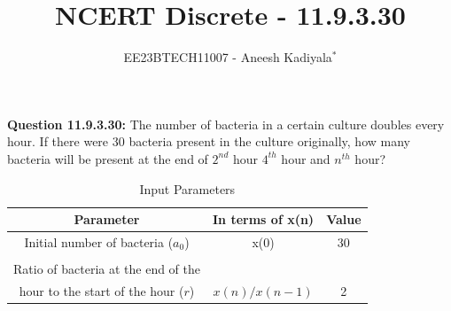 \documentclass[journal,12pt,twocolumn]{IEEEtran}
\theoremstyle{remark}
\begin{document}

\vspace{3cm}

\title{NCERT Discrete - 11.9.3.30}
\author{EE23BTECH11007 - Aneesh Kadiyala$^{*}$%
}
\maketitle
\newpage
\bigskip

\renewcommand{\thefigure}{\theenumi}
\renewcommand{\thetable}{\theenumi}

\vspace{3cm}
\textbf{Question 11.9.3.30:} The number of bacteria in a certain culture doubles every hour. If there were 30 bacteria present in the culture originally, how many bacteria will be present at the end of $2^{nd}$ hour $4^{th}$ hour and $n^{th}$ hour?
\\
\solution

\begin{table}[h!]
    \centering
    \caption{Input Parameters}
    \label{tab:1}
    \begin{tabular}{ | c | c | c | }
        \hline
        Parameter & In terms of x(n) & Value \\
        \hline
        Initial number of bacteria ($a_0$) & x(0) & 30 \\
        &&\\
        Ratio of bacteria at the end of the & & \\
        hour to the start of the hour ($r$) & $x(n)/x(n - 1)$ & 2 \\
        \hline
    \end{tabular}
\end{table}
\end{document}
